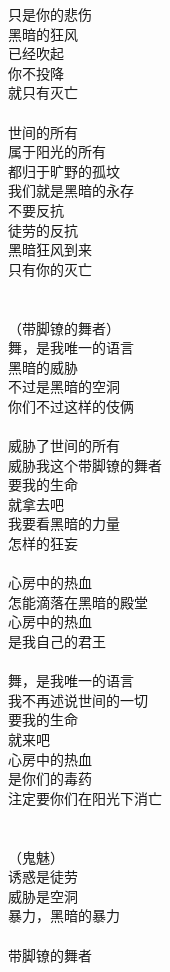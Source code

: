 只是你的悲伤\\
黑暗的狂风\\
已经吹起\\
你不投降\\
就只有灭亡\\
\\
世间的所有\\
属于阳光的所有\\
都归于旷野的孤坟\\
我们就是黑暗的永存\\
不要反抗\\
徒劳的反抗\\
黑暗狂风到来\\
只有你的灭亡\\
\\
\\
（带脚镣的舞者）\\
舞，是我唯一的语言\\
黑暗的威胁\\
不过是黑暗的空洞\\
你们不过这样的伎俩\\
\\
威胁了世间的所有\\
威胁我这个带脚镣的舞者\\
要我的生命\\
就拿去吧\\
我要看黑暗的力量\\
怎样的狂妄\\
\\
心房中的热血\\
怎能滴落在黑暗的殿堂\\
心房中的热血\\
是我自己的君王\\
\\
舞，是我唯一的语言\\
我不再述说世间的一切\\
要我的生命\\
就来吧\\
心房中的热血\\
是你们的毒药\\
注定要你们在阳光下消亡\\
\\
\\
（鬼魅）\\
诱惑是徒劳\\
威胁是空洞\\
暴力，黑暗的暴力\\
\\
带脚镣的舞者\\
